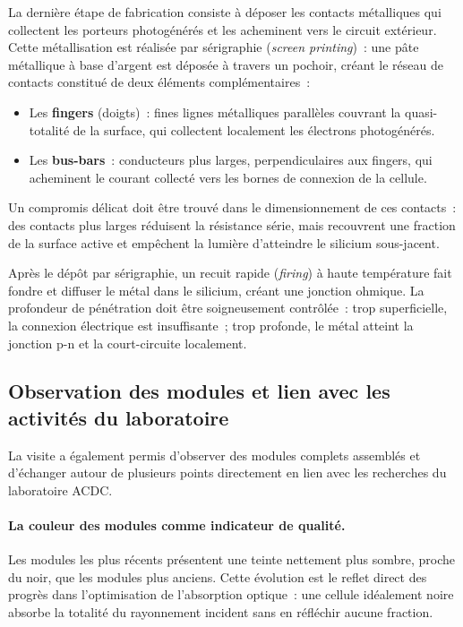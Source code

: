 \documentclass[12pt,a4paper]{report}
\begin{document}
La dernière étape de fabrication consiste à déposer les contacts métalliques qui collectent les porteurs photogénérés et les acheminent vers le circuit extérieur. Cette métallisation est réalisée par sérigraphie (\textit{screen printing})~: une pâte métallique à base d'argent est déposée à travers un pochoir, créant le réseau de contacts constitué de deux éléments complémentaires~:
\begin{itemize}
  \item Les \textbf{fingers} (doigts)~: fines lignes métalliques parallèles couvrant la quasi-totalité de la surface, qui collectent localement les électrons photogénérés.
  \item Les \textbf{bus-bars}~: conducteurs plus larges, perpendiculaires aux fingers, qui acheminent le courant collecté vers les bornes de connexion de la cellule.
\end{itemize}

Un compromis délicat doit être trouvé dans le dimensionnement de ces contacts~: des contacts plus larges réduisent la résistance série, mais recouvrent une fraction de la surface active et empêchent la lumière d'atteindre le silicium sous-jacent.

Après le dépôt par sérigraphie, un recuit rapide (\textit{firing}) à haute température fait fondre et diffuser le métal dans le silicium, créant une jonction ohmique. La profondeur de pénétration doit être soigneusement contrôlée~: trop superficielle, la connexion électrique est insuffisante~; trop profonde, le métal atteint la jonction p-n et la court-circuite localement.

\subsection{Observation des modules et lien avec les activités du laboratoire}

La visite a également permis d'observer des modules complets assemblés et d'échanger autour de plusieurs points directement en lien avec les recherches du laboratoire ACDC.

\paragraph{La couleur des modules comme indicateur de qualité.}
Les modules les plus récents présentent une teinte nettement plus sombre, proche du noir, que les modules plus anciens. Cette évolution est le reflet direct des progrès dans l'optimisation de l'absorption optique~: une cellule idéalement noire absorbe la totalité du rayonnement incident sans en réfléchir aucune fraction.
\end{document}
